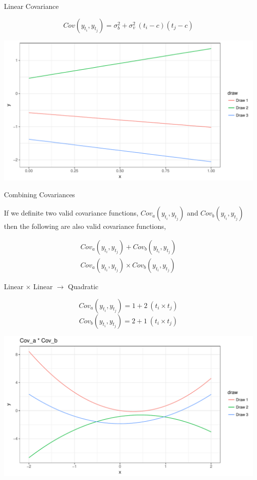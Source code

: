 \documentclass[11pt,ignorenonframetext,]{beamer}
\begin{document}
\begin{frame}[t]{Linear Covariance}

\vspace{-5mm}
\[ Cov(y_{t_i}, y_{t_j}) = \sigma^2_b + \sigma^2_v~(t_i-c)(t_j-c) \]

\begin{center}\includegraphics{Lec14_files/figure-beamer/unnamed-chunk-15-1} \end{center}

\end{frame}

\begin{frame}[t]{Combining Covariances}

If we definite two valid covariance functions,
\(Cov_a(y_{t_i}, y_{t_j})\) and \(Cov_b(y_{t_i}, y_{t_j})\) then the
following are also valid covariance functions,

\[
\begin{aligned}
Cov_a(y_{t_i}, y_{t_j}) + Cov_b(y_{t_i}, y_{t_j}) \\
Cov_a(y_{t_i}, y_{t_j}) \times Cov_b(y_{t_i}, y_{t_j})
\end{aligned}
\]

\end{frame}

\begin{frame}[t]{Linear \(\times\) Linear \(\to\) Quadratic}

\vspace{-5mm} \[ Cov_a(y_{t_i}, y_{t_j}) = 1 + 2~(t_i \times t_j) \]
\[ Cov_b(y_{t_i}, y_{t_j}) = 2 + 1~(t_i \times t_j) \]

\begin{center}\includegraphics{Lec14_files/figure-beamer/unnamed-chunk-16-1} \end{center}

\end{frame}
\end{document}
